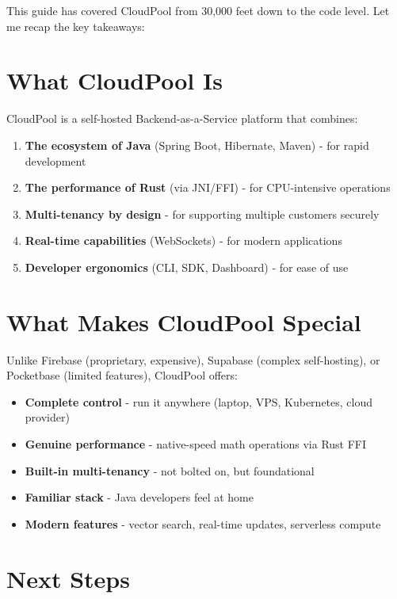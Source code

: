 \documentclass[11pt,a4paper]{report}
\begin{document}
This guide has covered CloudPool from 30,000 feet down to the code level. Let me recap the key takeaways:


\chapter{What CloudPool Is}


CloudPool is a self-hosted Backend-as-a-Service platform that combines:

\begin{enumerate}
\item \textbf{The ecosystem of Java} (Spring Boot, Hibernate, Maven) - for rapid development
\item \textbf{The performance of Rust} (via JNI/FFI) - for CPU-intensive operations
\item \textbf{Multi-tenancy by design} - for supporting multiple customers securely
\item \textbf{Real-time capabilities} (WebSockets) - for modern applications
\item \textbf{Developer ergonomics} (CLI, SDK, Dashboard) - for ease of use

\end{enumerate}

\chapter{What Makes CloudPool Special}


Unlike Firebase (proprietary, expensive), Supabase (complex self-hosting), or Pocketbase (limited features), CloudPool offers:

\begin{itemize}
\item \textbf{Complete control} - run it anywhere (laptop, VPS, Kubernetes, cloud provider)
\item \textbf{Genuine performance} - native-speed math operations via Rust FFI
\item \textbf{Built-in multi-tenancy} - not bolted on, but foundational
\item \textbf{Familiar stack} - Java developers feel at home
\item \textbf{Modern features} - vector search, real-time updates, serverless compute

\end{itemize}

\chapter{Next Steps}
\end{document}
